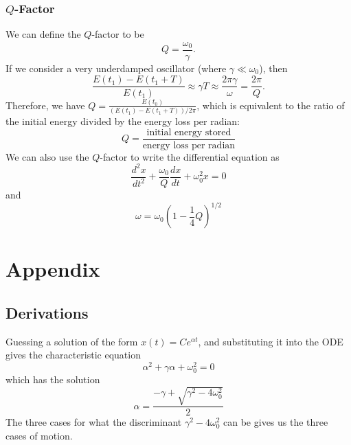 \documentclass{article}
\begin{document}
\subsubsection{$Q$-Factor}
We can define the $Q$-factor to be 
\begin{equation}
    \boxed{Q = \frac{\omega_0}{\gamma}}.
\end{equation}
If we consider a very underdamped oscillator (where $\gamma \ll \omega_0$), then 
\begin{equation}
    \frac{E(t_1)-E(t_1+T)}{E(t_1)} \approx \gamma T \approx \frac{2\pi \gamma}{\omega} = \frac{2\pi}{Q}.
\end{equation}
Therefore, we have $Q = \frac{E(t_0)}{(E(t_1)-E(t_1+T))/2\pi}$, which is equivalent to the ratio of the initial energy divided by the energy loss per radian: 
\begin{equation}
    \boxed{Q = \frac{\text{initial energy stored}}{\text{energy loss per radian}}}
\end{equation}
We can also use the $Q$-factor to write the differential equation as 
\begin{equation}
    \frac{d^2x}{dt^2}+\frac{\omega_0}{Q}\frac{dx}{dt}+\omega_0^2 x = 0
\end{equation}
and 
\begin{equation}
    \omega = \omega_0\left(1-\frac{1}{4}Q\right)^{1/2}
\end{equation}
\newpage
\section{Appendix}
\subsection{Derivations}
Guessing a solution of the form $x(t)=Ce^{\alpha t}$, and substituting it into the ODE gives the characteristic equation 
\begin{equation}
    \alpha^2 + \gamma \alpha + \omega_0^2 = 0
\end{equation}
which has the solution 
\begin{equation}
    \alpha = \frac{-\gamma + \sqrt{\gamma^2 - 4\omega_0^2}}{2}
\end{equation}
The three cases for what the discriminant $\gamma^2-4\omega_0^2$ can be gives us the three cases of motion.
\end{document}
